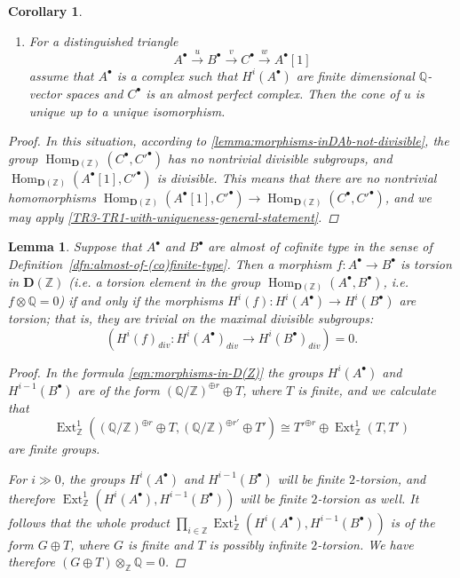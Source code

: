 \documentclass{article}
\DeclareMathOperator{\Ext}{Ext}
\DeclareMathOperator{\Hom}{Hom}
\newcommand{\QQ}{\mathbb{Q}}
\newcommand{\ZZ}{\mathbb{Z}}
\newtheorem{lemma}[theorem]{Lemma}
\newtheorem{corollary}[theorem]{Corollary}
\theoremstyle{definition}
\numberwithin{equation}{section}
\begin{document}
\begin{appendices}
\begin{corollary}
\begin{enumerate}
  \item[2)] For a distinguished triangle
    $$A^\bullet \xrightarrow{u} B^\bullet \xrightarrow{v} C^\bullet \xrightarrow{w} A^\bullet[1]$$
    assume that $A^\bullet$ is a complex such that $H^i (A^\bullet)$ are finite
    dimensional $\QQ$-vector spaces and $C^\bullet$ is an almost perfect
    complex. Then the cone of $u$ is unique up to a unique isomorphism.
  \end{enumerate}

  \begin{proof}
    In this situation, according to \ref{lemma:morphisms-inDAb-not-divisible},
    the group $\Hom_{\mathbf{D} (\ZZ)} (C^\bullet, C'^\bullet)$ has no
    nontrivial divisible subgroups, and
    $\Hom_{\mathbf{D} (\ZZ)} (A^\bullet [1], C'^\bullet)$ is divisible. This
    means that there are no nontrivial homomorphisms
    $\Hom_{\mathbf{D} (\ZZ)} (A^\bullet [1], C'^\bullet) \to \Hom_{\mathbf{D} (\ZZ)} (C^\bullet, C'^\bullet)$,
    and we may apply \ref{TR3-TR1-with-uniqueness-general-statement}.
  \end{proof}
\end{corollary}

\begin{lemma}
  \label{lemma:torsion-morphisms-in-D(Z)}
  Suppose that $A^\bullet$ and $B^\bullet$ are almost of cofinite type in the
  sense of Definition~\ref{dfn:almost-of-(co)finite-type}. Then a morphism
  $f\colon A^\bullet\to B^\bullet$ is torsion in $\mathbf{D} (\ZZ)$
  (i.e. a torsion element in the group
  $\Hom_{\mathbf{D} (\ZZ)} (A^\bullet, B^\bullet)$, i.e.
  $f\otimes \mathbb{Q} = 0$) if and only if the morphisms
  $H^i (f)\colon H^i (A^\bullet) \to H^i (B^\bullet)$
  are torsion; that is, they are trivial on the maximal divisible subgroups:
  $$(H^i (f)_{div}\colon H^i (A^\bullet)_{div} \to H^i (B^\bullet)_{div}) = 0.$$

  \begin{proof}
    In the formula \eqref{eqn:morphisms-in-D(Z)} the groups $H^i (A^\bullet)$
    and $H^{i-1} (B^\bullet)$ are of the form
    $(\mathbb{Q}/\mathbb{Z})^{\oplus r} \oplus T$, where $T$ is finite, and we
    calculate that
    \[ \Ext_\ZZ^1 ((\QQ/\ZZ)^{\oplus r} \oplus T, (\QQ/\ZZ)^{\oplus r'} \oplus T') \cong
    T'^{\oplus r} \oplus \Ext_\ZZ^1 (T, T') \]
    are finite groups.

    For $i \gg 0$, the groups $H^i (A^\bullet)$ and $H^{i-1} (B^\bullet)$ will
    be finite $2$-torsion, and therefore
    $\Ext_\ZZ^1 (H^i (A^\bullet), H^{i-1} (B^\bullet))$ will be finite
    $2$-torsion as well. It follows that the whole product
    $\prod_{i\in \mathbb{Z}} \Ext_\ZZ^1 (H^i (A^\bullet), H^{i-1} (B^\bullet))$
    is of the form $G \oplus T$, where $G$ is finite and $T$ is possibly
    infinite $2$-torsion. We have therefore $(G \oplus T)\otimes_\ZZ \QQ = 0$.


\end{proof}
\end{lemma}
\end{appendices}
\end{document}
